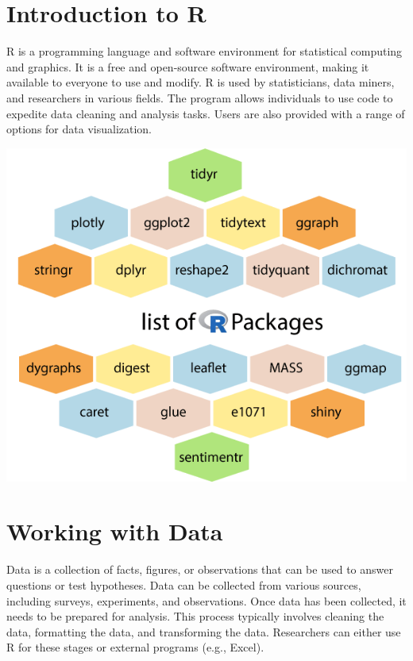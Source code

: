 \documentclass[
  b5paper]{book}
\begin{document}
\hypertarget{introduction-to-r}{%
\section*{Introduction to R}\label{introduction-to-r}}

R is a programming language and software environment for statistical computing and graphics. It is a free and open-source software environment, making it available to everyone to use and modify. R is used by statisticians, data miners, and researchers in various fields. The program allows individuals to use code to expedite data cleaning and analysis tasks. Users are also provided with a range of options for data visualization.

\includegraphics[width=1\textwidth,height=\textheight]{images/List-of-r-packages.png}

\hypertarget{working-with-data}{%
\section*{Working with Data}\label{working-with-data}}

Data is a collection of facts, figures, or observations that can be used to answer questions or test hypotheses. Data can be collected from various sources, including surveys, experiments, and observations. Once data has been collected, it needs to be prepared for analysis. This process typically involves cleaning the data, formatting the data, and transforming the data. Researchers can either use R for these stages or external programs (e.g., Excel).
\end{document}
